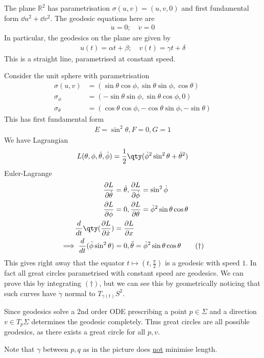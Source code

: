 \begin{example}
	The plane $\mathbb R^2$ has parametrisation $\sigma(u,v) = (u,v,0)$ and first fundamental form $\dd{u}^2 + \dd{v}^2$.
	The geodesic equations here are
	\begin{align*}
		\ddot u = 0;\quad \ddot v = 0
	\end{align*}
	In particular, the geodesics on the plane are given by
	\begin{align*}
		u(t) = \alpha t + \beta;\quad v(t) = \gamma t + \delta
	\end{align*}
	This is a straight line, parametrised at constant speed.
\end{example}

\begin{example}
	Consider the unit sphere with parametrisation
	\begin{align*}
		\sigma(u,v) &= (\sin \theta \cos \phi, \sin \theta \sin \phi, \cos \theta) \\
		\sigma_\phi &= (-\sin \theta \sin \phi, \sin \theta \cos \phi, 0) \\
		\sigma_\theta &= (\cos \theta \cos \phi, -\cos \theta \sin \phi, -\sin \theta)
	\end{align*}
	This has first fundamental form
	\begin{align*}
		E = \sin^2 \theta, F = 0, G = 1
	\end{align*}
	We have Lagrangian
	\begin{align*}
		L(\theta, \phi, \dot{\theta}, \dot{\phi}) = \frac{1}{2} \qty(\dot{\phi}^2 \sin^2 \theta + \dot{\theta}^2)
	\end{align*} 
	Euler-Lagrange
	\begin{align*}
		\frac{\partial L}{\partial \dot{\theta}} &= \dot{\theta}, \frac{\partial L}{\partial \dot{\phi}} = \sin^2 \dot{\phi} \\
		\frac{\partial L}{\partial \phi} &= 0, \frac{\partial L}{\partial \theta} = \dot{\phi}^2\sin \theta \cos \theta \\
		\frac{d }{d t} \qty(\frac{\partial L}{\partial \dot{x}}) &= \frac{\partial L}{\partial x} \\
		\implies \frac{d}{dt} (\dot{\phi} \sin^2 \theta) &= 0, \ddot{\theta} = \dot{\phi}^2 \sin \theta \cos \theta \tag{$\dagger$}
	\end{align*} 
	This gives right away that the equator $t \mapsto (t, \frac{\pi}{2})$ is a geodesic with speed $1$.
	In fact all great circles parametrised with constant speed are geodesics.
	We can prove this by integrating $(\dagger)$, but we can see this by geometrically noticing that such curves have $\ddot{\gamma}$ normal to $T_{\gamma(t)} S^2$.

	Since geodesics solve a 2nd order ODE prescribing a point $p \in \Sigma$ and a direction $v \in T_p \Sigma$ determines the geodesic completely.
	Thus great circles are all possible geodesics, as there exists a great circle for all $p, v$.

	Note that $\gamma$ between $p, q$ as in the picture does \underline{not} minimise length.
\end{example} 

